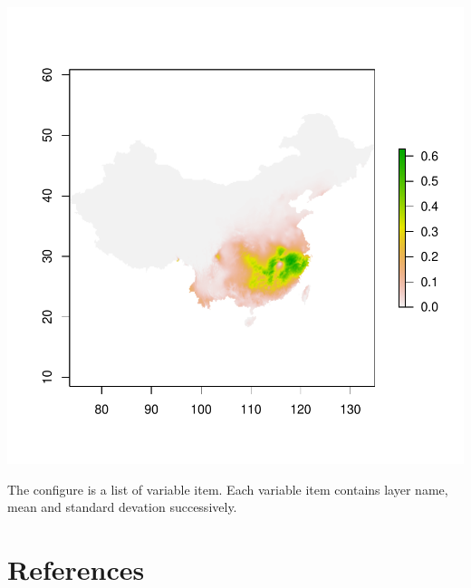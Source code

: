 \documentclass{report}
\begin{document}
\includegraphics{sdmvspecies-artificial_bell_response_method}

The configure is a list of variable item. Each variable item contains layer name, mean and standard devation successively.


\part{References}

\end{document}
